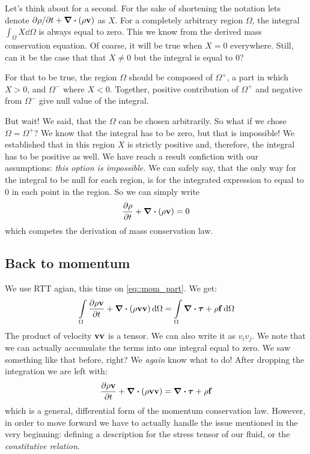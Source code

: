 \documentclass[justified, nobib]{tufte-handout}
\begin{document}
Let's think about for a second. For the sake of shortening the notation
lets denote \({\partial\rho}/{\partial t} + \div{(\rho \vb{v})}\) as \(X\). For a
completely arbitrary region \(\Omega\), the integral \(\int_\Omega X \dd{\Omega}\)
is always equal to zero. This we know from the derived mass conservation equation.
Of coarse, it will be true when \(X=0\) everywhere. Still, can it be the case that
that \(X\neq0\) but the integral is equal to 0?

For that to be true, the region \(\Omega\) should be composed of \(\Omega^+\),
a part in which \(X>0\), and \(\Omega^-\) where \(X<0\). Together, positive
contribution of \(\Omega^+\) and negative from \(\Omega^-\) give null value
of the integral.

But wait! We said, that the \(\Omega\) can be chosen arbitrarily. So what
if we chose \(\Omega = \Omega^+\)? We know that the integral has to be zero,
but that is impossible! We established that in this region \(X\) is strictly
positive and, therefore, the integral has to be positive as well. We have
reach a result confiction with our assumptions: \emph{this option is
	impossible.} We can safely say, that the only way for the integral to
be null for each region, is for the integrated expression to equal to 0
in each point in the region. So we can simply write
\[
	\pdv{\rho}{t} + \div{(\rho \vb{v})} = 0
\]
which competes the derivation of mass conservation law.


\subsection{Back to momentum}
We use RTT agian, this time on \autoref{eq::mom_part}. We get:
\[
	\int\limits_\Omega \pdv{\rho \vb{v}}{t}
	+ \div{\qty(\rho\vb{v}\vb{v} )} \dd{\Omega} =
	\int\limits_\Omega \div\bm{\tau} + \rho\vb{f} \dd{\Omega}
\]
The product of velocity \(\vb{v}\vb{v}\) is a tensor. We can also write
it as \(v_i v_j\). We note that we can actually accumulate the terms into
one integral equal to zero. We saw something like that before, right?
We \emph{again} know what to do! After dropping the integration we are
left with:
\begin{equation}\label{eq::momentum_general_form}
	\pdv{\rho \vb{v}}{t}
	+ \div{\qty(\rho\vb{v}\vb{v} )}  =
	\div\bm{\tau} + \rho\vb{f}
\end{equation}
which is a general, differential form of the momentum conservation law.
However, in order to move forward we have to actually handle the issue
mentioned in the very beginning: defining a description for the stress
tensor of our fluid, or the \emph{constitutive relation}.
\end{document}

